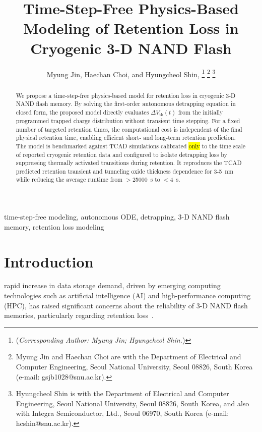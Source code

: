 \documentclass[journal,twoside,web]{ieeecolor}
\begin{document}
\linenumbers
\IEEEaftertitletext{\vspace{-1cm}} %
\title{Time-Step-Free Physics-Based Modeling of Retention Loss in Cryogenic 3-D NAND Flash}\author{Myung Jin, Haechan Choi, and Hyungcheol Shin, 
\thanks{(\textit{Corresponding Author: Myung Jin; Hyungcheol Shin.}) }
\thanks{Myung Jin and Haechan Choi are with the Department of Electrical and Computer Engineering, Seoul National University, Seoul 08826, South Korea (e-mail: gsjb1028@snu.ac.kr).}
\thanks{Hyungcheol Shin is with the Department of Electrical and Computer Engineering, Seoul National University, Seoul 08826, South Korea, and also with Integra Semiconductor, Ltd., Seoul 06970, South Korea (e-mail: hcshin@snu.ac.kr).}}

\maketitle
\begin{abstract}
We propose a time-step-free physics-based model for retention loss in cryogenic 3-D NAND flash memory.
By solving the first-order autonomous detrapping equation in closed form, the proposed model directly evaluates $\Delta V_\text{th}(t)$ from the initially programmed trapped charge distribution without transient time stepping.
For a fixed number of targeted retention times, the computational cost is independent of the final physical retention time, enabling efficient short- and long-term retention prediction.
The model is benchmarked against TCAD simulations calibrated \hl{only} to the time scale of reported cryogenic retention data and configured to isolate detrapping loss by suppressing thermally activated transitions during retention.
It reproduces the TCAD predicted retention transient and tunneling oxide thickness dependence for 3-5~nm while reducing the average runtime from $>$25000~s to $<$4~s.
\end{abstract}

\begin{IEEEkeywords}
time-step-free modeling, autonomous ODE, detrapping, 3-D NAND flash memory, retention loss modeling
\end{IEEEkeywords}

\section{Introduction}
\label{sec:introduction}
 rapid increase in data storage demand, driven by emerging computing technologies such as artificial intelligence (AI) and high-performance computing (HPC), has raised significant concerns about the reliability of 3-D NAND flash memories, particularly regarding retention loss~\cite{agoda}.
\end{document}
